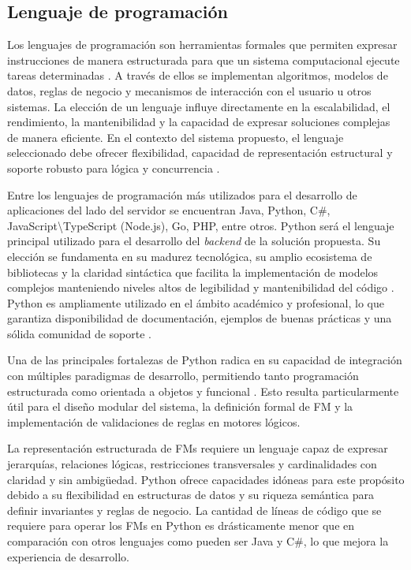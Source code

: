 \subsection{Lenguaje de programación}

Los lenguajes de programación son herramientas formales que permiten 
expresar instrucciones de manera estructurada para que un sistema 
computacional ejecute tareas determinadas \citep{sebesta2016}. A través de ellos se 
implementan algoritmos, modelos de datos, reglas de negocio y mecanismos de 
interacción con el usuario u otros sistemas. La elección de un lenguaje influye 
directamente en la escalabilidad, el rendimiento, la mantenibilidad y la 
capacidad de expresar soluciones complejas de manera eficiente. En el contexto 
del sistema propuesto, el lenguaje seleccionado debe ofrecer flexibilidad, 
capacidad de representación estructural y soporte robusto para lógica y 
concurrencia \citep{sommerville2016se}.

Entre los lenguajes de programación más utilizados para el desarrollo de aplicaciones del lado del servidor
se encuentran Java, Python, C\#, JavaScript\textbackslash TypeScript (Node.js), Go, PHP, entre otros. Python 
será el lenguaje principal utilizado para el desarrollo del \textit{backend} de la 
solución propuesta. Su elección se fundamenta en su madurez tecnológica, su amplio 
ecosistema de bibliotecas y la claridad sintáctica que facilita la implementación de 
modelos complejos manteniendo niveles altos de legibilidad y mantenibilidad del código 
\citep{van1995python, lutz2013learning}. Python es ampliamente utilizado en el ámbito 
académico y profesional, lo que garantiza disponibilidad de documentación, ejemplos de 
buenas prácticas y una sólida comunidad de soporte \citep{ray2014large}.

Una de las principales fortalezas de Python radica en su capacidad de integración 
con múltiples paradigmas de desarrollo, permitiendo tanto programación estructurada 
como orientada a objetos y funcional \citep{lutz2013learning}. Esto resulta particularmente 
útil para el diseño modular del sistema, la definición formal de \ac{FM} y la implementación 
de validaciones de reglas en motores lógicos.

La representación estructurada de \ac{FM}s requiere un lenguaje 
capaz de expresar jerarquías, relaciones lógicas, restricciones transversales y 
cardinalidades con claridad y sin ambigüedad. Python ofrece capacidades idóneas para 
este propósito debido a su flexibilidad en estructuras de datos y su riqueza semántica 
para definir invariantes y reglas de negocio. La cantidad de líneas de código que se requiere
para operar los \ac{FM}s en Python es drásticamente menor que en comparación con otros lenguajes 
como pueden ser Java y C\#, lo que mejora la experiencia de desarrollo.

